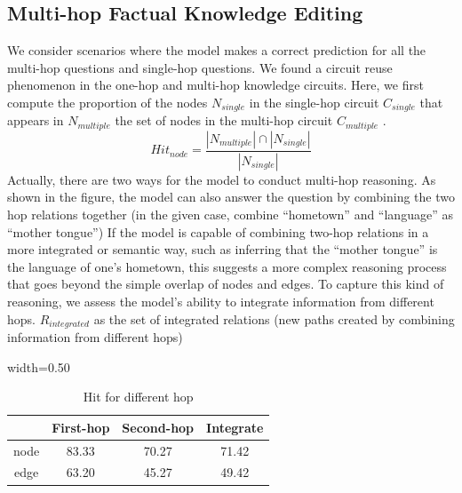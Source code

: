 \subsection{Multi-hop Factual Knowledge Editing}
\label{app:multi-hop}
We consider scenarios where the model makes a correct prediction for all the multi-hop questions and single-hop questions.
We found a circuit reuse phenomenon in the one-hop and multi-hop knowledge circuits. 
Here, we first compute the proportion of the nodes \( N_{single} \) in the single-hop circuit \( C_{single} \) that appears in
 \( N_{multiple} \) the set of nodes in the multi-hop circuit \( C_{multiple} \) .
 \begin{equation}
    Hit_{node} = \frac{|N_{multiple}| \cap |N_{single}|  }{|N_{single}|}
    \label{eqution:node_hit}
\end{equation}
Actually, there are two ways for the model to conduct multi-hop reasoning.
As shown in the figure, the model can also answer the question by combining the two hop relations together (in the given case, combine ``hometown'' and ``language'' as ``mother tongue'')
If the model is capable of combining two-hop relations in a more integrated or semantic way, such as inferring that the ``mother tongue'' is the language of one’s hometown, this suggests a more complex reasoning process that goes beyond the simple overlap of nodes and edges. 
To capture this kind of reasoning, we assess the model’s ability to integrate information from different hops. 
\( R_{integrated} \) as the set of integrated relations (new paths created by combining information from different hops)
 \begin{table}
    \centering
    \scriptsize
    \vspace{-8pt}
    \caption{Hit for different hop}
    \label{fig:multi-hop}
    \begin{adjustbox}{width=0.50\textwidth}
           \begin{tabular}{cccc}
        \toprule
        & First-hop & Second-hop & Integrate  \\
        \hline
        node & 83.33 & 70.27 & 71.42 \\
        edge & 63.20 & 45.27 & 49.42 \\
        \bottomrule
      \end{tabular}
    \end{adjustbox}
    \vspace{-10pt}
\end{table}
